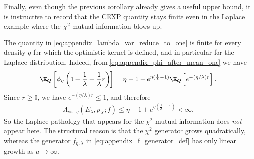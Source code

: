 Finally, even though the previous corollary already gives a useful upper bound, it is instructive to record that the CEXP quantity stays finite even in the Laplace example where the $\chi^2$ mutual information blows up.

\begin{remark}
\label{rem:appendix_laplace_finite}
The quantity in \eqref{eq:appendix_lambda_var_reduce_to_one} is finite for every density $q$ for which the optimistic kernel is defined, and in particular for the Laplace distribution.
Indeed, from \eqref{eq:appendix_phi_after_mean_one} we have
\begin{align*}
    \E_Q\left[\phi_\eta\left(1 - \frac{1}{\lambda} + \frac{1}{\lambda}r\right)\right]
    = \eta - 1 + e^{\eta(\frac{1}{\lambda}-1)}\E_Q\left[e^{-(\eta/\lambda)r}\right].
\end{align*}
Since $r \geq 0$, we have $e^{-(\eta/\lambda)r} \leq 1$, and therefore
\begin{align}
    \Lambda_{\mathrm{var}, q}(E_\lambda, p_X; f)
    \leq
    \eta - 1 + e^{\eta(\frac{1}{\lambda}-1)} < \infty.
    \label{eq:appendix_uniform_finiteness}
\end{align}
So the Laplace pathology that appears for the $\chi^2$ mutual information does \emph{not} appear here.
The structural reason is that the $\chi^2$ generator grows quadratically, whereas the generator
$f_{\eta,\lambda}$ in \eqref{eq:appendix_f_generator_def} has only linear growth as $u \to \infty$.
\end{remark}
